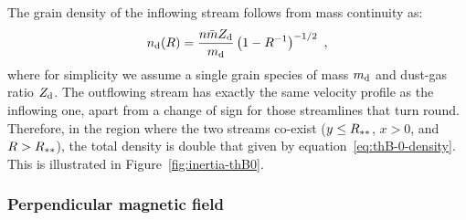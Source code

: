 The grain density of the inflowing stream follows from mass continuity as:
\begin{equation}
  \label{eq:thB-0-density}
  n_{\text{d}}(R) = \frac{n \bar{m} Z_{\text{d}}}{m_{\text{d}}} \left( 1 - R^{-1} \right)^{-1/2} \ ,
\end{equation}
where for simplicity we assume a single grain species of mass
\(m_{\text{d}}\) and dust-gas ratio \(Z_{\text{d}}\). The outflowing stream has
exactly the same velocity profile as the inflowing one, apart from a
change of sign for those streamlines that turn round.  Therefore, in
the region where the two streams co-exist (\(y \le R_{**}\),
\(x > 0\), and \(R > R_{**}\)), the total density is double that
given by equation~\eqref{eq:thB-0-density}.  This is illustrated in
Figure~\ref{fig:inertia-thB0}.

\subsubsection{Perpendicular magnetic field}
\label{sec:perp-magn-field}


